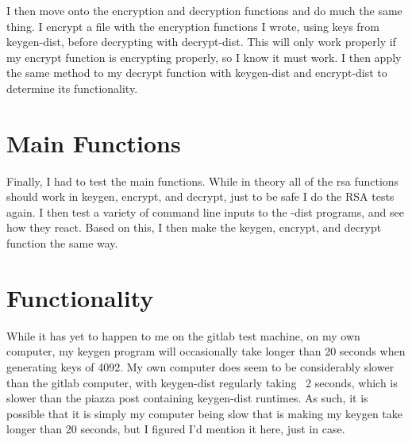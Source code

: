 \documentclass[11pt]{article}
\begin{document}
I then move onto the encryption and decryption functions and do much the same thing. I encrypt a file with the encryption functions I wrote, using keys from keygen-dist, before decrypting with decrypt-dist. This will only work properly if my encrypt function is encrypting properly, so I know it must work. I then apply the same method to my decrypt function with keygen-dist and encrypt-dist to determine its functionality.

\section{Main Functions}
Finally, I had to test the main functions. While in theory all of the rsa functions should work in keygen, encrypt, and decrypt, just to be safe I do the RSA tests again. I then test a variety of command line inputs to the -dist programs, and see how they react. Based on this, I then make the keygen, encrypt, and decrypt function the same way.

\section{Functionality}
While it has yet to happen to me on the gitlab test machine, on my own computer, my keygen program will occasionally take longer than 20 seconds when generating keys of 4092. My own computer does seem to be considerably slower than the gitlab computer, with keygen-dist regularly taking ~2 seconds, which is slower than the piazza post containing keygen-dist runtimes. As such, it is possible that it is simply my computer being slow that is making my keygen take longer than 20 seconds, but I figured I'd mention it here, just in case.
\end{document}
